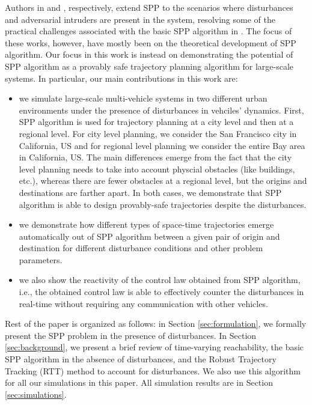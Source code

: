 Authors in \cite{Bansal2017} and \cite{chen2016robust}, respectively, extend SPP to the scenarios where disturbances and adversarial intruders are present in the system, resolving some of the practical challenges associated with the basic SPP algorithm in \cite{Chen15c}. The focus of these works, however, have mostly been on the theoretical development of SPP algorithm. Our focus in this work is instead on demonstrating the potential of SPP algorithm as a provably safe trajectory planning algorithm for large-scale systems. In particular, our main contributions in this work are:
\begin{itemize}
\item we simulate large-scale multi-vehicle systems in two different urban environments under the presence of disturbances in vehciles' dynamics. First, SPP algorithm is used for trajectory planning at a city level and then at a regional level. For city level planning, we consider the San Francisco city in California, US and for regional level planning we consider the entire Bay area in California, US. The main differences emerge from the fact that the city level planning needs to take into account physcial obstacles (like buildings, etc.), whereas there are fewer obstacles at a regional level, but the origins and destinations are farther apart. In both cases, we demonstrate that SPP algorithm is able to design provably-safe trajectories despite the disturbances.
\item we demonstrate how different types of space-time trajectories emerge automatically out of SPP algorithm between a given pair of origin and destination for different disturbance conditions and other problem parameters.
\item we also show the reactivity of the control law obtained from SPP algorithm, i.e., the obtained control law is able to effectively counter the disturbances in real-time without requiring any communication with other vehicles.      
\end{itemize}

Rest of the paper is organized as follows: in Section \ref{sec:formulation}, we formally present the SPP problem in the presence of disturbances. In Section \ref{sec:background}, we present a brief review of time-varying reachability, the basic SPP algorithm \cite{Chen15c} in the absence of disturbances, and the Robust Trajectory Tracking (RTT) method \cite{Bansal2017} to account for disturbances. We also use this algorithm for all our simulations in this paper. All simulation results are in Section \ref{sec:simulations}.